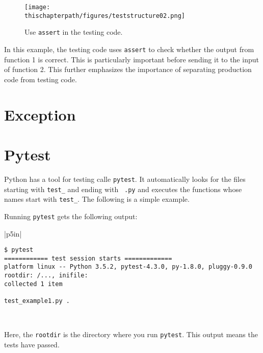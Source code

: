 \begin{figure}[h] \centering
{\texttt{[image: \\thischapterpath/figures/teststructure02.png]}}
\caption{Use {\tt assert} in the testing code.}
\label{fig:teststructure02}
\end{figure}

In this example, the testing code uses {\tt assert} to check whether
the output from function 1 is correct.  This is particularly important
before sending it to the input of function 2.  This further emphasizes
the importance of separating production code from testing code.


\section{Exception}

\section{Pytest}

Python has a tool for testing calle {\tt pytest}. It automatically
looks for the files starting with {\tt test\_} and ending with {\tt
  .py} and executes the functions whose names start with {\tt test\_}.
The following is a simple example.


\resetlinenumber[1]
\linenumbers
\begin{tt}
  
\end{tt}
\nolinenumbers

Running {\tt pytest} gets the following output:

\vspace{0.2in}

\noindent
\begin{tabular}{|p{5in}|}\hline
\begin{verbatim}
$ pytest
============ test session starts =============
platform linux -- Python 3.5.2, pytest-4.3.0, py-1.8.0, pluggy-0.9.0
rootdir: /..., inifile:
collected 1 item

test_example1.py .                                
\end{verbatim}
\\ \hline
\end{tabular}
\vspace{0.2in}

Here, the {\tt rootdir} is the directory where you run {\tt pytest}.
This output means the tests have passed.

